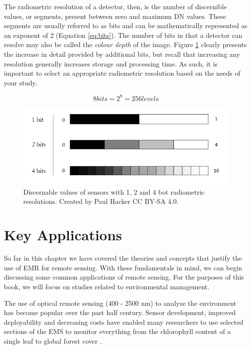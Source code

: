 \documentclass[
]{book}
\begin{document}
The radiometric resolution of a detector, then, is the number of
discernible values, or segments, present between zero and maximum DN
values. These segments are usually referred to as bits and can be
mathematically represented as an exponent of 2 (Equation
\eqref{eq:bits}). The number of bits in that a detector can resolve may
also be called the \emph{colour depth} of the image. Figure
\ref{fig:11-radiometric} clearly presents the increase in detail
provided by additional bits, but recall that increasing any resolution
generally increases storage and processing time. As such, it is
important to select an appropriate radiometric resolution based on the
needs of your study.

\begin{equation}
8 bits = 2^8 = 256 levels
\label{eq:bits}
\end{equation}

\begin{figure}
\includegraphics[width=9.46in]{images/11-radiometric-res} \caption{Discernable values of sensors with 1, 2 and 4 bot radiometric resolutions. Created by Paul Hacker CC BY-SA 4.0.}\label{fig:11-radiometric}
\end{figure}

\hypertarget{key-applications}{%
\section{Key Applications}\label{key-applications}}

So far in this chapter we have covered the theories and concepts that
justify the use of EMR for remote sensing. With these fundamentals in
mind, we can begin discussing some common applications of remote
sensing. For the purposes of this book, we will focus on studies related
to environmental management.

The use of optical remote sensing (400 - 2500 nm) to analyze the
environment has become popular over the past half century. Sensor
development, improved deployability and decreasing costs have enabled
many researchers to use selected sections of the EMS to monitor
everything from the chlorophyll content of a single leaf \citep{curran_remote_1989}
to global forest cover \citep{hansen_high-resolution_2013}.
\end{document}
